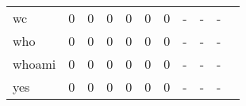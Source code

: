 \begin{longtable}{lp{1.2cm}p{1.2cm}p{1.2cm}p{1.2cm}p{1.2cm}p{1.2cm}p{1.2cm}p{1.2cm}p{1.2cm}p{1.2cm}}
wc        &                                     0 &                                                  0 &                                                  0 &                                                  0 &                                                  0 &                                                  0 &                                                  - &                                                  - &                                                  - \\
who       &                                     0 &                                                  0 &                                                  0 &                                                  0 &                                                  0 &                                                  0 &                                                  - &                                                  - &                                                  - \\
whoami    &                                     0 &                                                  0 &                                                  0 &                                                  0 &                                                  0 &                                                  0 &                                                  - &                                                  - &                                                  - \\
yes       &                                     0 &                                                  0 &                                                  0 &                                                  0 &                                                  0 &                                                  0 &                                                  - &                                                  - &                                                  - \\
\end{longtable}
